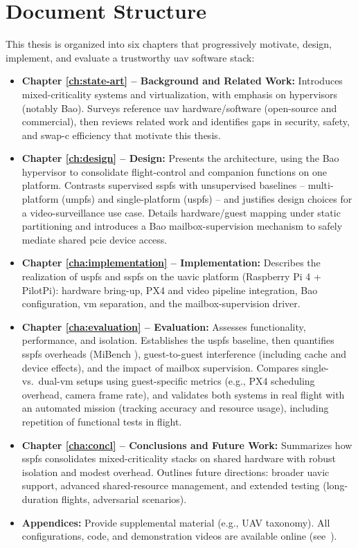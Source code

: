 \section{Document Structure}
\label{sec:doc-structure}
This thesis is organized into six chapters that progressively motivate, design, implement, and evaluate a trustworthy \gls{uav} software stack:

\begin{itemize}
\item
\textbf{Chapter \ref{ch:state-art} -- Background and Related Work:}
Introduces mixed-criticality systems and virtualization, with emphasis on
hypervisors (notably Bao). Surveys reference \gls{uav} hardware/software
(open-source and commercial), then reviews related work and identifies gaps in
security, safety, and \gls{swap-c} efficiency that motivate this thesis.

\item
\textbf{Chapter \ref{ch:design} -- Design:}
Presents the  architecture, using the Bao hypervisor to
consolidate flight-control and companion functions on one platform. Contrasts
supervised \gls{sspfs} with unsupervised baselines -- multi-platform
(\gls{umpfs}) and single-platform (\gls{uspfs}) -- and justifies design choices
for a video-surveillance use case. Details hardware/guest mapping under static
partitioning and introduces a Bao mailbox-supervision mechanism to safely
mediate shared \gls{pcie} device access.

\item
\textbf{Chapter \ref{cha:implementation} -- Implementation:}
Describes the realization of \gls{uspfs} and \gls{sspfs} on the \gls{uavic}
platform (Raspberry Pi 4 + PilotPi): hardware bring-up, PX4 and video pipeline
integration, Bao configuration, \gls{vm} separation, and the mailbox-supervision
driver.

\item
\textbf{Chapter \ref{cha:evaluation} -- Evaluation:}
Assesses functionality, performance, and isolation. Establishes the \gls{uspfs}
baseline, then quantifies \gls{sspfs} overheads (MiBench ),
guest-to-guest interference (including cache and device effects), and the impact
of mailbox supervision. Compares single- vs.\ dual-\gls{vm} setups using
guest-specific metrics (e.g., PX4 scheduling overhead, camera frame rate), and
validates both systems in real flight with an automated mission (tracking
accuracy and resource usage), including repetition of functional tests in
flight.

\item
\textbf{Chapter \ref{cha:concl} -- Conclusions and Future Work:}
Summarizes how \gls{sspfs} consolidates mixed-criticality stacks on shared
hardware with robust isolation and modest overhead. Outlines future directions:
broader \gls{uavic} support, advanced shared-resource management, and extended
testing (long-duration flights, adversarial scenarios).

\item
\textbf{Appendices:}
Provide supplemental material (e.g., UAV taxonomy). All configurations, code,
and demonstration videos are available online (see~\cite{thesis-sw-github}).
\end{itemize}



